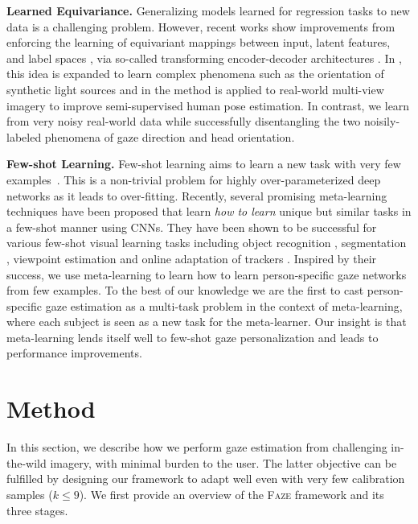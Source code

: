 \documentclass[10pt,twocolumn,letterpaper]{article}
\newcommand{\faze}[0]{\textsc{Faze}\xspace}
\newcommand{\Paragraph}[1]
{\vspace{1.5mm} \noindent \textbf{#1}}
\begin{document}
\Paragraph{Learned Equivariance.}
Generalizing models learned for regression tasks to new data is a challenging problem.
However, recent works show improvements from enforcing the learning of equivariant mappings between input, latent features, and label spaces \cite{Honari2018CVPR,Rhodin2018ECCV}, via so-called transforming encoder-decoder architectures \cite{Hinton2011ICANN}.
In \cite{Worrall2017ICCV}, this idea is expanded to learn complex phenomena such as the orientation of synthetic light sources 
and in \cite{Rhodin2018ECCV} the method is applied to real-world multi-view imagery to improve semi-supervised human pose estimation.
In contrast, we learn from very noisy real-world data while successfully disentangling the two noisily-labeled phenomena of gaze direction and head orientation.

\Paragraph{Few-shot Learning.} Few-shot learning aims to learn a new task with very few examples~\cite{lake2015human}. This is a non-trivial problem for highly over-parameterized deep networks as it leads to over-fitting. Recently, several promising meta-learning \cite{snell2017prototypical,vinyals2016matching, rezende2016oneshot,santoro2016meta, Finn2017ICML,Nichol2018:reptile,ravi2017metalstm} techniques have been proposed that learn \emph{how to learn} unique but similar tasks in a few-shot manner using CNNs. They have been shown to be successful for various few-shot visual learning tasks including object recognition \cite{Finn2017ICML}, segmentation \cite{rakelly2018few}, viewpoint estimation \cite{Tseng2019BMVC} and online adaptation of trackers \cite{park2018meta}. Inspired by their success, we use meta-learning to learn how to learn person-specific gaze networks from few examples. To the best of our knowledge we are the first to cast person-specific gaze estimation as a multi-task problem in the context of meta-learning, where each subject is seen as a new task for the meta-learner. 
Our insight is that meta-learning lends itself well to few-shot gaze personalization and leads to performance improvements.









 
\section{Method}


In this section, we describe how we perform gaze estimation from challenging in-the-wild imagery, with minimal burden to the user. The latter objective can be fulfilled by designing our framework to adapt well even with very few calibration samples ($k\leq 9$).
We first provide an overview of the  \faze framework and its three stages.
\end{document}
